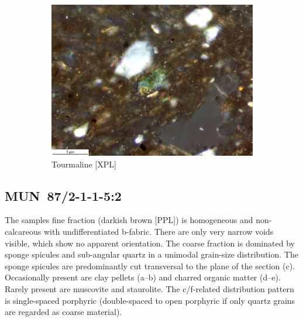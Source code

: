 \documentclass[a4paper]{article}
\begin{document}
\begin{figure}[H]
	\begin{subfigure}[t]{.32\textwidth}
		\includegraphics[width=\textwidth]{ThinSections/2-2_40x_XPL.jpg}
		\caption{Tourmaline [XPL]}
	\end{subfigure}
	\caption{}
	\label{fig:2_mun}
\end{figure}

\newpage\subsection{MUN~87/2-1-1-5:2 \citep[mun\#104; Fig.~\ref{fig:mun.pottery}.3; Pikunda-Munda style;][472 Pl.~91.5]{Seidensticker.2021e}}

\begin{multicols}{2}
\noindent The samples fine fraction (darkish brown [PPL]) is homogeneous and non-calcareous with undifferentiated b-fabric. There are only very narrow voids visible, which show no apparent orientation. The coarse fraction is dominated by sponge spicules and sub-angular quartz in a unimodal grain-size distribution. The sponge spicules are predominantly cut transversal to the plane of the section (c). Occasionally present are clay pellets (a--b) and charred organic matter (d--e). Rarely present are muscovite and staurolite. The c/f-related distribution pattern is single-spaced porphyric (double-spaced to open porphyric if only quartz grains are regarded as coarse material).
\end{multicols}
\end{document}
